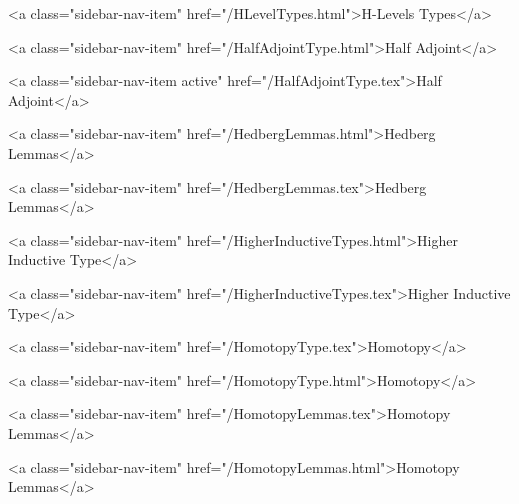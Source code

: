       
        
          <a class="sidebar-nav-item" href="/HLevelTypes.html">H-Levels Types</a>
        
      
    
      
        
          <a class="sidebar-nav-item" href="/HalfAdjointType.html">Half Adjoint</a>
        
      
    
      
        
          <a class="sidebar-nav-item active" href="/HalfAdjointType.tex">Half Adjoint</a>
        
      
    
      
        
          <a class="sidebar-nav-item" href="/HedbergLemmas.html">Hedberg Lemmas</a>
        
      
    
      
        
          <a class="sidebar-nav-item" href="/HedbergLemmas.tex">Hedberg Lemmas</a>
        
      
    
      
        
          <a class="sidebar-nav-item" href="/HigherInductiveTypes.html">Higher Inductive Type</a>
        
      
    
      
        
          <a class="sidebar-nav-item" href="/HigherInductiveTypes.tex">Higher Inductive Type</a>
        
      
    
      
        
          <a class="sidebar-nav-item" href="/HomotopyType.tex">Homotopy</a>
        
      
    
      
        
          <a class="sidebar-nav-item" href="/HomotopyType.html">Homotopy</a>
        
      
    
      
        
          <a class="sidebar-nav-item" href="/HomotopyLemmas.tex">Homotopy Lemmas</a>
        
      
    
      
        
          <a class="sidebar-nav-item" href="/HomotopyLemmas.html">Homotopy Lemmas</a>
        
